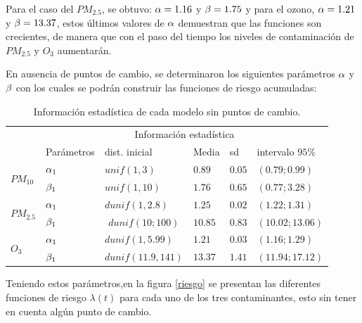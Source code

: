 Para el caso del $PM_{2.5}$, se obtuvo: $\alpha=1.16$ y $\beta=1.75$ y para el ozono, $\alpha=1.21$ y $\beta=13.37$, estos últimos valores de $\alpha$ demuestran que las funciones son crecientes, de manera que con el paso del tiempo los niveles de contaminación de $PM_{2.5}$ y $O_3$ aumentarán.  

En ausencia de puntos de cambio, se determinaron los siguientes parámetros $\alpha$  y  $\beta$ con los cuales se podrán construir las funciones de riesgo acumuladas: 

\begin{table}[!h]
\centering
\begin{tabular}{|l|l|l|l|l|l|}
\hline
& \multicolumn{5}{c|}{Información estadística} \\
\cline{2-6}
& Parámetros & dist. inicial  & Media & sd  &   intervalo $95 \%$\\
\hline \hline
\multirow{2}{1.5cm}{$PM_{10}$} & $\alpha_1$ & $unif(1,3)$ & $0.89$ & $0.05$ & $(0.79;0.99)$ \\ \cline{2-6}
& $\beta_1$& $unif(1,10)$ & $1.76$ & $0.65$ & $(0.77;3.28)$\\  \cline{1-6}
\multirow{2}{1.5cm}{$PM_{2.5}$} & $\alpha_1$ & $dunif(1,2.8)$& $1.25$ & $0.02$ & $(1.22;1.31)$\\ \cline{2-6}
& $\beta_1$ & \multicolumn{1}{c|}{$dunif(10;100)$} & $10.85$ & $0.83$ & $(10.02;13.06)$\\ \cline{1-6}
\multirow{2}{1.5cm}{$O_3$} & $\alpha_1$ & $dunif(1,5.99)$ & $1.21$& $0.03$ & $(1.16;1.29)$\\ \cline{2-6}
&$\beta_1$ & \multicolumn{1}{c|}{$dunif(11.9,141)$} & $13.37$ & $1.41$ & $(11.94;17.12)$\\ \cline{1-6}
\end{tabular}
\caption{Información estadística de cada modelo sin puntos de cambio.}
\label{infoestad}
\end{table}



Teniendo estos parámetros,en la figura \ref{riesgo} se presentan las diferentes funciones de riesgo $\lambda (t)$ para cada uno de los tres contaminantes, esto sin tener en cuenta algún punto de cambio. 



